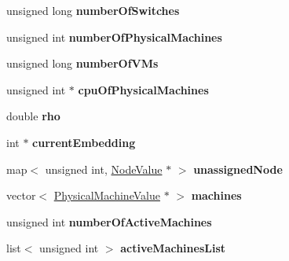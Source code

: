 \begin{DoxyCompactItemize}
\item 
\hypertarget{classGuaranteedEmbedding_ae99598330ca826f2abb50d382366cb1c}{unsigned long {\bfseries number\-Of\-Switches}}\label{classGuaranteedEmbedding_ae99598330ca826f2abb50d382366cb1c}

\item 
\hypertarget{classGuaranteedEmbedding_a24f231e15aab00704d79a16355435a87}{unsigned int {\bfseries number\-Of\-Physical\-Machines}}\label{classGuaranteedEmbedding_a24f231e15aab00704d79a16355435a87}

\item 
\hypertarget{classGuaranteedEmbedding_a376d295ddb91e279873d6de478b201ab}{unsigned long {\bfseries number\-Of\-V\-Ms}}\label{classGuaranteedEmbedding_a376d295ddb91e279873d6de478b201ab}

\item 
\hypertarget{classGuaranteedEmbedding_ae3f1ee99c341c1164bc710e1cb094193}{unsigned int $\ast$ {\bfseries cpu\-Of\-Physical\-Machines}}\label{classGuaranteedEmbedding_ae3f1ee99c341c1164bc710e1cb094193}

\item 
\hypertarget{classGuaranteedEmbedding_a8052bd0cdc9a773f2d1f77b2bf8833d2}{double {\bfseries rho}}\label{classGuaranteedEmbedding_a8052bd0cdc9a773f2d1f77b2bf8833d2}

\item 
\hypertarget{classGuaranteedEmbedding_a435eca8c76b3c0aad0057599a871120a}{int $\ast$ {\bfseries current\-Embedding}}\label{classGuaranteedEmbedding_a435eca8c76b3c0aad0057599a871120a}

\item 
\hypertarget{classGuaranteedEmbedding_ac0990885f7f52a601c785c9980dee9b4}{map$<$ unsigned int, \hyperlink{classNodeValue}{\-Node\-Value} $\ast$ $>$ {\bfseries unassigned\-Node}}\label{classGuaranteedEmbedding_ac0990885f7f52a601c785c9980dee9b4}

\item 
\hypertarget{classGuaranteedEmbedding_a32efa850f0b6743dd01863478c0e951c}{vector$<$ \hyperlink{classPhysicalMachineValue}{\-Physical\-Machine\-Value} $\ast$ $>$ {\bfseries machines}}\label{classGuaranteedEmbedding_a32efa850f0b6743dd01863478c0e951c}

\item 
\hypertarget{classGuaranteedEmbedding_a99e75cc60860659b2b0ee207f9b7de89}{unsigned int {\bfseries number\-Of\-Active\-Machines}}\label{classGuaranteedEmbedding_a99e75cc60860659b2b0ee207f9b7de89}

\item 
\hypertarget{classGuaranteedEmbedding_a5ca6b554b2ffb6d05013d61997727f79}{list$<$ unsigned int $>$ {\bfseries active\-Machines\-List}}\label{classGuaranteedEmbedding_a5ca6b554b2ffb6d05013d61997727f79}


\end{DoxyCompactItemize}
